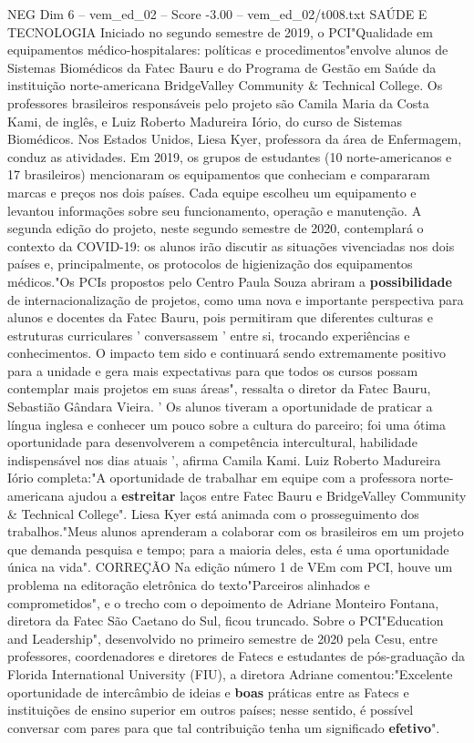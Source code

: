 \begin{textsample}{NEG Dim 6 – vem\_ed\_02 – Score -3.00 – vem\_ed\_02/t008.txt}  \label{ex:f6_neg_054}
SAÚDE E TECNOLOGIA Iniciado no segundo semestre de 2019, o PCI"Qualidade em equipamentos médico-hospitalares: políticas e procedimentos"envolve alunos de Sistemas Biomédicos da Fatec Bauru e do Programa de Gestão em Saúde da instituição norte-americana BridgeValley Community \& Technical College.
Os professores brasileiros responsáveis pelo projeto são Camila Maria da Costa Kami, de inglês, e Luiz Roberto Madureira Iório, do curso de Sistemas Biomédicos.
Nos Estados Unidos, Liesa Kyer, professora da área de Enfermagem, conduz as atividades.
Em 2019, os grupos de estudantes (10 norte-americanos e 17 brasileiros) mencionaram os equipamentos que conheciam e compararam marcas e preços nos dois países.
Cada equipe escolheu um equipamento e levantou informações sobre seu funcionamento, operação e manutenção.
A segunda edição do projeto, neste segundo semestre de 2020, contemplará o contexto da COVID-19: os alunos irão discutir as situações vivenciadas nos dois países e, principalmente, os protocolos de higienização dos equipamentos médicos."Os PCIs propostos pelo Centro Paula Souza abriram a \textbf{possibilidade} de internacionalização de projetos, como uma nova e importante perspectiva para alunos e docentes da Fatec Bauru, pois permitiram que diferentes culturas e estruturas curriculares ' conversassem ' entre si, trocando experiências e conhecimentos.
O impacto tem sido e continuará sendo extremamente positivo para a unidade e gera mais expectativas para que todos os cursos possam contemplar mais projetos em suas áreas", ressalta o diretor da Fatec Bauru, Sebastião Gândara Vieira. ' Os alunos tiveram a oportunidade de praticar a língua inglesa e conhecer um pouco sobre a cultura do parceiro; foi uma ótima oportunidade para desenvolverem a competência intercultural, habilidade indispensável nos dias atuais ', afirma Camila Kami.
Luiz Roberto Madureira Iório completa:"A oportunidade de trabalhar em equipe com a professora norte-americana ajudou a \textbf{estreitar} laços entre Fatec Bauru e BridgeValley Community \& Technical College".
Liesa Kyer está animada com o prosseguimento dos trabalhos."Meus alunos aprenderam a colaborar com os brasileiros em um projeto que demanda pesquisa e tempo; para a maioria deles, esta é uma oportunidade única na vida".
CORREÇÃO Na edição número 1 de VEm com PCI, houve um problema na editoração eletrônica do texto"Parceiros alinhados e comprometidos", e o trecho com o depoimento de Adriane Monteiro Fontana, diretora da Fatec São Caetano do Sul, ficou truncado.
Sobre o PCI"Education and Leadership", desenvolvido no primeiro semestre de 2020 pela Cesu, entre professores, coordenadores e diretores de Fatecs e estudantes de pós-graduação da Florida International University (FIU), a diretora Adriane comentou:"Excelente oportunidade de intercâmbio de ideias e \textbf{boas} práticas entre as Fatecs e instituições de ensino superior em outros países; nesse sentido, é possível conversar com pares para que tal contribuição tenha um significado \textbf{efetivo}".

\end{textsample}
